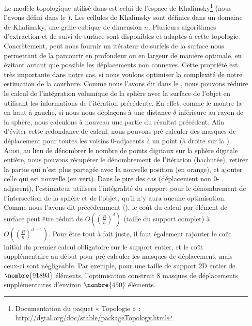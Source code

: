 Le modèle topologique utilisé dans \DGtal est celui de l'espace de
Khalimsky\footnote{Documentation du paquet « Topologie » :
\url{http://dgtal.org/doc/stable/packageTopology.html}} (nous l'avons défini
dans le ). Les cellules de Khalimsky sont définies
dans un domaine de Khalimsky, \cad une grille cubique de dimension $n$.
Plusieurs algorithmes d'extraction et de suivi de surface sont disponibles et
adaptés à cette topologie. Concrètement, \DGtal peut nous fournir un itérateur
de surfels de la surface nous permettant de la parcourir en profondeur ou en
largeur de manière optimale, \cad en évitant autant que possible les
déplacements non connexes. Cette propriété est très importante dans notre cas, si
nous voulons optimiser la complexité de notre estimation de la courbure. Comme
nous l'avons dit dans le , nous pouvons réduire le
calcul de l'intégration volumique de la sphère avec la surface de l'objet en
utilisant les informations de l'itération précédente. En effet, comme le montre
la  en haut à gauche, si nous nous déplaçons à une
distance $\delta$ inférieure au rayon de la sphère, nous calculons à nouveau une
partie du résultat précédent. Afin d'éviter cette redondance de calcul, nous
pouvons pré-calculer des masques de déplacement pour toutes les voisins
$0$-adjacents à un point (à droite sur la ).
Ainsi, au lieu de dénombrer le nombre de points digitaux sur la sphère digitale
entière, nous pouvons récupérer le dénombrement de l'itération (hachurée),
retirer la partie qui n'est plus partagée avec la nouvelle position (en orange),
et ajouter celle qui est nouvelle (en vert).
Dans le pire des cas (déplacement non $0$-adjacent), l'estimateur utilisera
l'intégralité du support pour le dénombrement de l'intersection de la sphère et
de l'objet, \cad qu'il n'y aura aucune optimisation. Comme nous l'avons dit
précédemment (), le coût du calcul par élément de
surface peut être réduit de $O\left(\left(\frac{R}{h}\right)^d\right)$ (taille du support complet) à
$O\left(\left(\frac{R}{h}\right)^{d-1}\right)$. Pour être tout à fait juste, il faut également
rajouter le coût initial du premier calcul obligatoire sur le support entier, et
le coût supplémentaire au début pour pré-calculer les masques de déplacement,
mais ceux-ci sont négligeable. Par exemple, pour une taille de support 2D entier
de $\nombre{91893}$ éléments, l'optimisation construit $8$ masques de
déplacements supplémentaires d'environ $\nombre{450}$ éléments.

